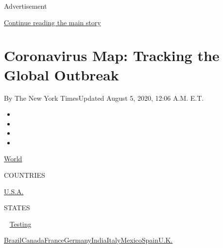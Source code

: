 Advertisement

\protect\hyperlink{after-top}{Continue reading the main story}

\hypertarget{coronavirus-map-tracking-the-global-outbreak}{%
\section{Coronavirus Map: Tracking the Global
Outbreak}\label{coronavirus-map-tracking-the-global-outbreak}}

By The New York TimesUpdated August 5, 2020, 12:06 A.M. E.T.

\begin{itemize}
\item
\item
\item
\item
\end{itemize}

\href{https://www.nytimes.com/interactive/2020/world/coronavirus-maps.html}{World}~

COUNTRIES

\textbar{}
\href{https://www.nytimes.com/interactive/2020/us/coronavirus-us-cases.html}{U.S.A.}~

STATES

~
\href{https://www.nytimes.com/interactive/2020/us/coronavirus-testing.html}{Testing}

\href{https://www.nytimes.com/interactive/2020/world/americas/brazil-coronavirus-cases.html}{Brazil}\href{https://www.nytimes.com/interactive/2020/world/canada/canada-coronavirus-cases.html}{Canada}\href{https://www.nytimes.com/interactive/2020/world/europe/france-coronavirus-cases.html}{France}\href{https://www.nytimes.com/interactive/2020/world/europe/germany-coronavirus-cases.html}{Germany}\href{https://www.nytimes.com/interactive/2020/world/asia/india-coronavirus-cases.html}{India}\href{https://www.nytimes.com/interactive/2020/world/europe/italy-coronavirus-cases.html}{Italy}\href{https://www.nytimes.com/interactive/2020/world/americas/mexico-coronavirus-cases.html}{Mexico}\href{https://www.nytimes.com/interactive/2020/world/europe/spain-coronavirus-cases.html}{Spain}\href{https://www.nytimes.com/interactive/2020/world/europe/united-kingdom-coronavirus-cases.html}{U.K.}

